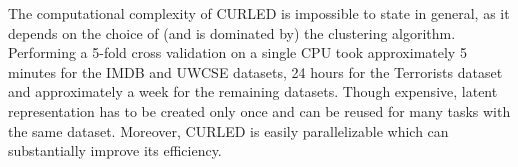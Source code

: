The computational complexity of CURLED is impossible to state in general, as it depends on the choice of (and is dominated by) the clustering algorithm.
Performing a 5-fold cross validation on a single CPU took approximately 5 minutes for the IMDB and UWCSE datasets, 24 hours for the Terrorists dataset and approximately a week for the remaining datasets.
Though expensive, latent representation has to be created only once and can be reused for many tasks with the same dataset.
Moreover, CURLED is easily parallelizable which can substantially improve its efficiency.


\begin{table}[t]
\captionsetup{justification=centerlast}
\begin{center}
\footnotesize
\caption{Vocabulary sizes. M indicates MRC, while S and H indicate CURLED representations with spectral and hierarchical clustering, respectively. Vocabulary sizes obtained with \textit{merging} and \textit{combination} similarities were similar, so only the one for merging is reported. }
\end{center}
\end{table}
